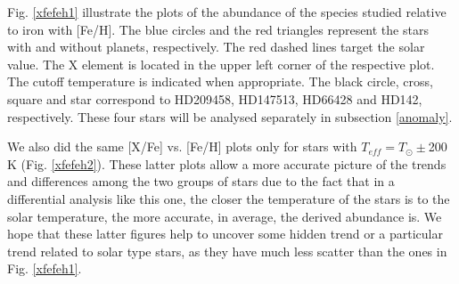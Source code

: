 \documentclass[dvips,12pt,a4paper]{report}
\begin{document}
{{Fig. \ref{xfefeh1} illustrate the plots of the abundance of the species studied relative to iron with [Fe/H]. The blue circles and the red triangles represent the stars with and without planets, respectively. The red dashed lines target the solar value. The X element is located in the upper left corner of the respective plot. The cutoff temperature is indicated when appropriate. The black circle, cross, square and star correspond to HD209458, HD147513, HD66428 and HD142, respectively. These four stars will be analysed separately in subsection \ref{anomaly}.

We also did the same [X/Fe] vs. [Fe/H] plots only for stars with $T_{eff}=T_\odot\pm$200 K (Fig. \ref{xfefeh2}). These latter plots allow a more accurate picture of the trends and differences among the two groups of stars due to the fact that in a differential analysis like this one, the closer the temperature of the stars is to the solar temperature, the more accurate, in average, the derived abundance is. We hope that these latter figures help to uncover some hidden trend or a particular trend related to solar type stars, as they have much less scatter than the ones in Fig. \ref{xfefeh1}.

}}
\end{document}
